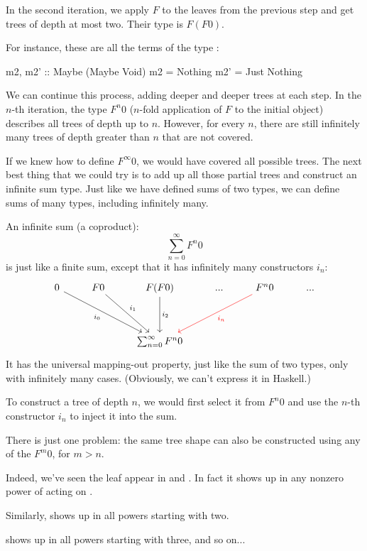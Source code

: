 \documentclass[DaoFP]{subfiles}
\begin{document}
In the second iteration, we apply $F$ to the leaves from the previous step and get trees of depth at most two. Their type is $F(F 0)$. 

For instance, these are all the terms of the type :
\begin{haskell}
m2, m2' :: Maybe (Maybe Void)
m2 = Nothing
m2' = Just Nothing
\end{haskell}

We can continue this process, adding deeper and deeper trees at each step. In the $n$-th iteration, the type $F^n 0$ ($n$-fold application of $F$ to the initial object) describes all trees of depth up to $n$. However, for every $n$, there are still infinitely many trees of depth greater than $n$ that are not covered. 

If we knew how to define $F^{\infty} 0$, we would have covered all possible trees. The next best thing that we could try is to add up all those partial trees and construct an infinite sum type. Just like we have defined sums of two types, we can define sums of many types, including infinitely many. 

An infinite sum (a coproduct):
$$ \sum_{n = 0}^{\infty} F^n 0$$
is just like a finite sum, except that it has infinitely many constructors $i_n$:
\[
 \begin{tikzcd}
 0
 \arrow[ddrr, "i_0"']
 & F 0
  \arrow[ddr, "i_1"]
& F (F 0)
  \arrow[dd, "i_2"]
 & ...
 & F^n 0
  \arrow[ddll, red, "i_n"]
 & ...
 \\
 \\
 &&\sum_{n = 0}^{\infty} F^n 0
  \end{tikzcd}
\]
It has the universal mapping-out property, just like the sum of two types, only with infinitely many cases. (Obviously, we can't express it in Haskell.)

To construct a tree of depth $n$, we would first select it from $F^n 0$ and use the $n$-th constructor $i_n$ to inject it into the sum. 

There is just one problem: the same tree shape can also be constructed using any of the $F^m 0$, for $m > n$. 

Indeed, we've seen the leaf  appear in  and . In fact it shows up in any nonzero power of  acting on . 

Similarly,  shows up in all powers starting with two.

 shows up in all powers starting with three, and so on...
\end{document}
